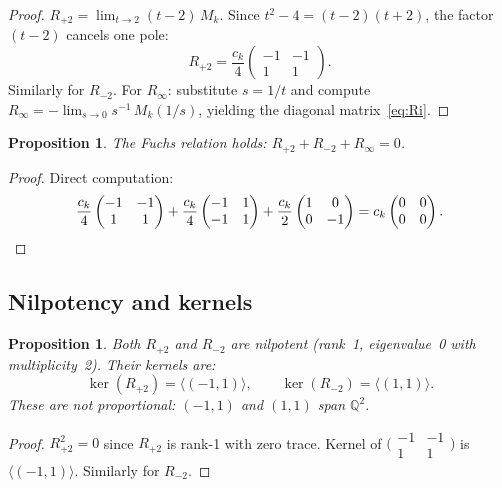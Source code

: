 \documentclass[11pt]{article}
\theoremstyle{plain}
\newtheorem{proposition}[theorem]{Proposition}
\theoremstyle{definition}
\theoremstyle{remark}
\newcommand{\Q}{\mathbb{Q}}
\begin{document}
\begin{proof}
$R_{+2} = \lim_{t \to 2}(t-2)\, M_k$. Since $t^2 - 4 = (t-2)(t+2)$,
the factor $(t-2)$ cancels one pole:
\[
  R_{+2} = \frac{c_k}{4} \begin{pmatrix} -1 & -1 \\ 1 & 1 \end{pmatrix}.
\]
Similarly for $R_{-2}$. For $R_\infty$: substitute $s = 1/t$ and
compute $R_\infty = -\lim_{s \to 0} s^{-1}\, M_k(1/s)$, yielding
the diagonal matrix~\eqref{eq:Ri}.
\end{proof}

\begin{proposition}\label{prop:fuchs}
The Fuchs relation holds: $R_{+2} + R_{-2} + R_\infty = 0$.
\end{proposition}

\begin{proof}
Direct computation:
\[
  \frac{c_k}{4}\begin{pmatrix} -1 & -1 \\ 1 & 1 \end{pmatrix}
  + \frac{c_k}{4}\begin{pmatrix} -1 & 1 \\ -1 & 1 \end{pmatrix}
  + \frac{c_k}{2}\begin{pmatrix} 1 & 0 \\ 0 & -1 \end{pmatrix}
  = c_k \begin{pmatrix} 0 & 0 \\ 0 & 0 \end{pmatrix}.
  \qedhere
\]
\end{proof}

\subsection{Nilpotency and kernels}

\begin{proposition}\label{prop:nilpotent}
Both $R_{+2}$ and $R_{-2}$ are nilpotent (rank~1, eigenvalue~0 with
multiplicity~2). Their kernels are:
\[
  \ker(R_{+2}) = \langle(-1, 1)\rangle, \qquad
  \ker(R_{-2}) = \langle(1, 1)\rangle.
\]
These are \emph{not} proportional: $(-1,1)$ and $(1,1)$ span $\Q^2$.
\end{proposition}

\begin{proof}
$R_{+2}^2 = 0$ since $R_{+2}$ is rank-1 with zero trace. Kernel
of $\bigl(\begin{smallmatrix} -1 & -1 \\ 1 & 1 \end{smallmatrix}%
\bigr)$ is $\langle(-1,1)\rangle$. Similarly for $R_{-2}$.
\end{proof}
\end{document}
